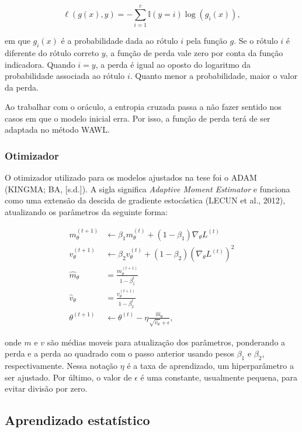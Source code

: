 \documentclass[12pt,twoside,brazilian]{book}
\begin{document}
\[
\ell(g(x), y) = -\sum_{i=1}^c \mathbb I(y=i)\log(g_i(x)),
\]

em que \(g_i(x)\) é a probabilidade dada ao rótulo \(i\) pela função
\(g\). Se o rótulo \(i\) é diferente do rótulo correto \(y\), a função
de perda vale zero por conta da função indicadora. Quando \(i=y\), a
perda é igual ao oposto do logaritmo da probabilidade associada ao
rótulo \(i\). Quanto menor a probabilidade, maior o valor da perda.

Ao trabalhar com o oráculo, a entropia cruzada passa a não fazer sentido
nos casos em que o modelo inicial erra. Por isso, a função de perda terá
de ser adaptada no método WAWL.

\hypertarget{sec-otimizador}{%
\subsubsection{Otimizador}\label{sec-otimizador}}

O otimizador utilizado para os modelos ajustados na tese foi o ADAM
(KINGMA; BA, {[}s.d.{]}). A sigla significa \emph{Adaptive Moment
Estimator} e funciona como uma extensão da descida de gradiente
estocástica (LECUN et al., 2012), atualizando os parâmetros da seguinte
forma:

\[
\begin{array}{cl}
m_{\theta}^{(t+1)} &\leftarrow \beta_1m_{\theta}^{(t)} + (1-\beta_1)\nabla_\theta L^{(t)} \\
v_{\theta}^{(t+1)} &\leftarrow \beta_2v_{\theta}^{(t)} + (1-\beta_2)(\nabla_\theta L^{(t)})^2 \\
\hat{m}_{\theta} &= \frac{m_\theta^{(t+1)}}{1-\beta_1^t} \\
\hat{v}_{\theta} &= \frac{v_\theta^{(t+1)}}{1-\beta_2^t} \\
\theta^{(t+1)} &\leftarrow \theta^{(t)} - \eta \frac{\hat{m}_{\theta}}{\sqrt{\hat{v}_{\theta}} + \epsilon},
\end{array}
\]

onde \(m\) e \(v\) são médias moveis para atualização dos parâmetros,
ponderando a perda e a perda ao quadrado com o passo anterior usando
pesos \(\beta_1\) e \(\beta_2\), respectivamente. Nessa notação \(\eta\)
é a taxa de aprendizado, um hiperparâmetro a ser ajustado. Por último, o
valor de \(\epsilon\) é uma constante, usualmente pequena, para evitar
divisão por zero.

\hypertarget{aprendizado-estatuxedstico}{%
\subsection{Aprendizado estatístico}\label{aprendizado-estatuxedstico}}
\end{document}
